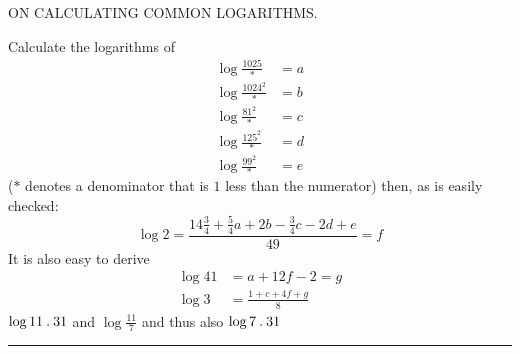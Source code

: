 \clearpage
{}%
\renewcommand{\BookRunningTitle}{On Calculating Common Logarithms}
\begin{center}\Large ON CALCULATING COMMON LOGARITHMS.\end{center}
Calculate the logarithms of
\[
\begin{aligned}
\log\frac{1025}{*}&=a\\
\log\frac{1024^2}{*}&=b\\
\log\frac{81^2}{*}&=c\\
\log\frac{125^2}{*}&=d\\
\log\frac{99^2}{*}&=e
\end{aligned}
\]
($*$ denotes a denominator that is $1$ less than the numerator) then, as is easily checked:
\[
\log 2=\frac{14\frac34+\frac54a+2b-\frac34c-2d+e}{49}=f
\]
It is also easy to derive
\[
\begin{aligned}
\log 41&=a+12f-2=g\\
\log 3&=\frac{1+c+4f+g}{8}
\end{aligned}
\]
$\log 11\mathbin{.}31$ and $\log\frac{11}{7}$ and thus also $\log 7\mathbin{.}31$\par\medskip\noindent\rule{.32\textwidth}{.3pt}
